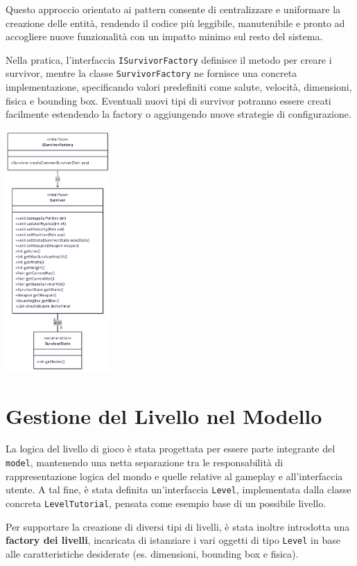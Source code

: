 \documentclass[a4paper,12pt]{report}
\begin{document}
Questo approccio orientato ai pattern consente di centralizzare e uniformare la creazione delle entità, rendendo il codice più leggibile, manutenibile e pronto ad accogliere nuove funzionalità con un impatto minimo sul resto del sistema.

Nella pratica, l'interfaccia \texttt{ISurvivorFactory} definisce il metodo per creare i survivor, mentre la classe \texttt{SurvivorFactory} ne fornisce una concreta implementazione, specificando valori predefiniti come salute, velocità, dimensioni, fisica e bounding box. Eventuali nuovi tipi di survivor potranno essere creati facilmente estendendo la factory o aggiungendo nuove strategie di configurazione.

\begin{center}
\includegraphics[width=0.3\textwidth]{img/Survivor.png}
\end{center}

\section{Gestione del Livello nel Modello}

La logica del livello di gioco è stata progettata per essere parte integrante del \texttt{model}, mantenendo una netta separazione tra le responsabilità di rappresentazione logica del mondo e quelle relative al gameplay e all'interfaccia utente. A tal fine, è stata definita un'interfaccia \texttt{Level}, implementata dalla classe concreta \texttt{LevelTutorial}, pensata come esempio base di un possibile livello.

Per supportare la creazione di diversi tipi di livelli, è stata inoltre introdotta una \textbf{factory dei livelli}, incaricata di istanziare i vari oggetti di tipo \texttt{Level} in base alle caratteristiche desiderate (es. dimensioni, bounding box e fisica).
\end{document}
